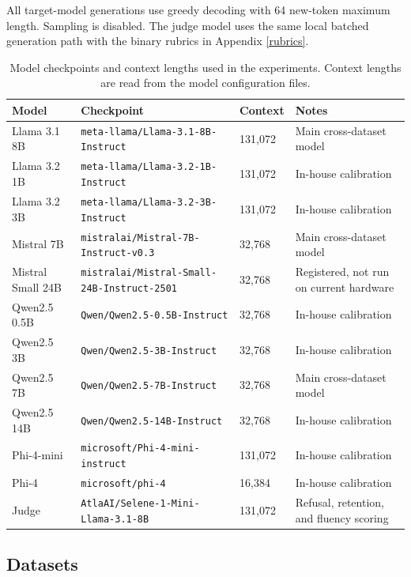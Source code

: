 \documentclass{article}
\begin{document}
All target-model generations use greedy decoding with 64 new-token maximum
length. Sampling is disabled. The judge model uses the same local batched
generation path with the binary rubrics in Appendix \ref{rubrics}.

\begin{table}[h]
\centering
\small
\begin{tabular}{llll}
\hline
Model & Checkpoint & Context & Notes \\
\hline
Llama 3.1 8B & \texttt{meta-llama/Llama-3.1-8B-Instruct} & 131{,}072 & Main cross-dataset model \\
Llama 3.2 1B & \texttt{meta-llama/Llama-3.2-1B-Instruct} & 131{,}072 & In-house calibration \\
Llama 3.2 3B & \texttt{meta-llama/Llama-3.2-3B-Instruct} & 131{,}072 & In-house calibration \\
Mistral 7B & \texttt{mistralai/Mistral-7B-Instruct-v0.3} & 32{,}768 & Main cross-dataset model \\
Mistral Small 24B & \texttt{mistralai/Mistral-Small-24B-Instruct-2501} & 32{,}768 & Registered, not run on current hardware \\
Qwen2.5 0.5B & \texttt{Qwen/Qwen2.5-0.5B-Instruct} & 32{,}768 & In-house calibration \\
Qwen2.5 3B & \texttt{Qwen/Qwen2.5-3B-Instruct} & 32{,}768 & In-house calibration \\
Qwen2.5 7B & \texttt{Qwen/Qwen2.5-7B-Instruct} & 32{,}768 & Main cross-dataset model \\
Qwen2.5 14B & \texttt{Qwen/Qwen2.5-14B-Instruct} & 32{,}768 & In-house calibration \\
Phi-4-mini & \texttt{microsoft/Phi-4-mini-instruct} & 131{,}072 & In-house calibration \\
Phi-4 & \texttt{microsoft/phi-4} & 16{,}384 & In-house calibration \\
Judge & \texttt{AtlaAI/Selene-1-Mini-Llama-3.1-8B} & 131{,}072 & Refusal, retention, and fluency scoring \\
\hline
\end{tabular}
\caption{Model checkpoints and context lengths used in the experiments. Context lengths are read from the model configuration files.}
\label{tab:appendix-models}
\end{table}

\subsection{Datasets}
\end{document}
